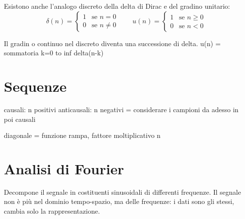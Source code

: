 Esistono anche l'analogo discreto della delta di Dirac e del gradino unitario:
$$\delta(n) = \begin{cases}
1 & \text{se } n = 0 \\
0 & \text{se } n \neq 0
\end{cases}
\qquad
u(n) = \begin{cases}
1 & \text{se } n \geq 0 \\
0 & \text{se } n < 0
\end{cases}$$

Il gradin o continuo nel discreto diventa una successione di delta. 
u(n) = sommatoria k=0 to inf delta(n-k)

\section{Sequenze}
causali: n positivi
anticausali: n negativi
= considerare i campioni da adesso in poi causali

diagonale = funzione rampa, fattore moltiplicativo n

\section{Analisi di Fourier}
Decompone il segnale in costituenti sinusoidali di differenti frequenze. Il segnale non è più nel dominio tempo-spazio, ma delle frequenze: i dati sono gli stessi, cambia solo la rappresentazione.

 








